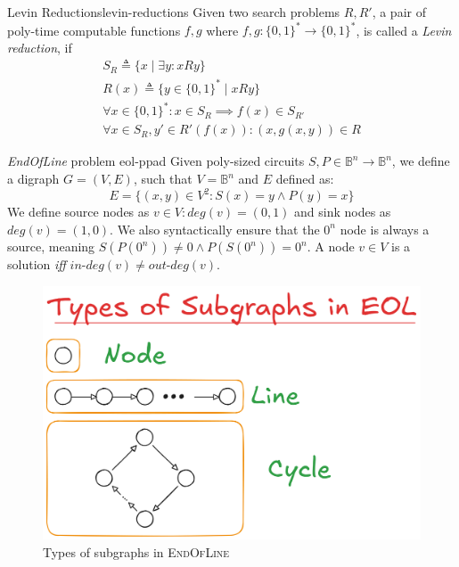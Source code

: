 \begin{definitionbox}{Levin Reductions}{levin-reductions}
	\label{def:levin-reductions}
	Given two search problems $R,R'$,
	a pair of poly-time computable functions \(f,g\) where \(f,g: \{0,1\}^* \to \{0,1\}^*\), is
	called a \textit{Levin reduction}, if
	\begin{gather*}
		S_R \triangleq \{x \mid \exists y : xRy\} \\
		R(x) \triangleq \{y \in \{0,1\}^* \mid xRy\} \\
		\forall x \in \{0,1\}^*: x \in  S_R \implies f(x) \in S_{R'}\\
		\forall x \in S_R, y' \in R'(f(x)): (x,g(x,y)) \in R
	\end{gather*}
\end{definitionbox}

\begin{definitionbox}{\textit{EndOfLine} problem \cite{papadimitriou_ComplexityParityArgument_1994}}{eol-ppad}
	Given poly-sized circuits $S, P \in \mathbb{B}^n \to \mathbb{B}^n$,
	we define a digraph $G = (V,E)$, such that $V= \mathbb{B}^n$ and $E$ defined as:
	$$
		E = \{(x,y) \in V^2: S(x) = y \wedge P(y) = x\}
	$$
	We define source nodes as $v \in V: \textit{deg}(v) = (0,1)$  and sink nodes as
	$\textit{deg}(v) = (1,0)$.
	We also syntactically ensure that the $0^n$ node is always a source, meaning
	$S(P(0^n)) \neq 0 \wedge P(S(0^n)) = 0^n$.
	A node $v \in V$ is a solution \textit{iff} $\textit{in-deg}(v) \neq \textit{out-deg}(v)$.
\end{definitionbox}

\begin{figure}
	\centering
	\includegraphics[width=0.7\linewidth]{assets/eol-subgraphs.png}
	\caption{Types of subgraphs in \textsc{EndOfLine}}
	\label{fig:eol-subgraphs}
\end{figure}

\vspace{0.2cm}


